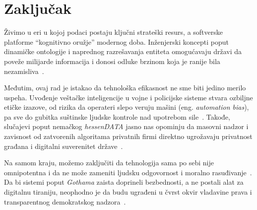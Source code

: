 ﻿\documentclass[12pt]{article}
\begin{document}
\section{Zaključak}

Živimo u eri u kojoj podaci postaju ključni strateški resurs, a softverske platforme \enquote{kognitivno oružje} modernog doba. Inženjerski koncepti poput dinamičke ontologije i naprednog razrešavanja entiteta omogućavaju državi da poveže milijarde informacija i donosi odluke brzinom koja je ranije bila nezamisliva~\cite{wei2024brief, architecture2024}.

Međutim, ovaj rad je istakao da tehnološka efikasnost ne sme biti jedino merilo uspeha. Uvođenje veštačke inteligencije u vojne i policijske sisteme stvara ozbiljne etičke izazove, od rizika da operateri slepo veruju mašini (eng. \textit{automation bias}), pa sve do gubitka suštinske ljudske kontrole nad upotrebom sile~\cite{woodcock2024human, tilbury2024automation}. 
Takođe, slučajevi poput nemačkog \textit{hessenDATA} jasno nas opominju da masovni nadzor i zavisnost od zatvorenih algoritama privatnih firmi direktno ugrožavaju privatnost građana i digitalni suverenitet države~\cite{ulbricht2024palantir, bverfg2023ruling}.

Na samom kraju, možemo zaključiti da tehnologija sama po sebi nije omnipotentna i da ne može zameniti ljudsku odgovornost i moralno rasuđivanje~\cite{architecture2024, ethical2025reconnaissance}. 
Da bi sistemi poput \textit{Gothama} zaista doprineli bezbednosti, a ne postali alat za digitalnu tiraniju, neophodno je da budu ugrađeni u čvrst okvir vladavine prava i transparentnog demokratskog nadzora~\cite{carnegie2024private, ulbricht2024palantir}.


\newpage
\printbibliography
\end{document}
